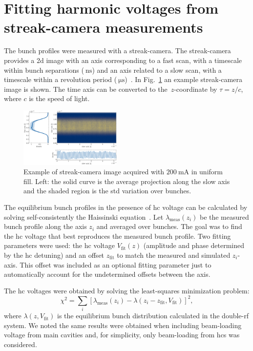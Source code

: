 \documentclass[a4paper,
               ]{jacow}
\begin{document}
\section{Fitting harmonic voltages from streak-camera measurements}
The bunch profiles were measured with a streak-camera. The streak-camera provides a 2d image with an axis corresponding to a fast scan, with a timescale within bunch separations ($\SI{}{\nano\second}$) and an axis related to a slow scan, with a timescale within a revolution period ($\SI{}{\micro\second}$)~\cite{Brosi:IFAST22}. In Fig.~\ref{fig:streak_camera_image} an example streak-camera image is shown. The time axis can be converted to the~$z$-coordinate by $\tau = z/c$, where $c$ is the speed of light.
\begin{figure}
    \centering
    \includegraphics[width=0.45\textwidth]{WEPR42_f1.pdf}
    \caption{Example of streak-camera image acquired with $\SI{200}{\milli\ampere}$ in uniform fill. Left: the solid curve is the average projection along the slow axis and the shaded region is the std variation over bunches.}
    \label{fig:streak_camera_image}
\end{figure}

The equilibrium bunch profiles in the presence of \gls{hc} voltage can be calculated by solving self-consistently the Haissinski equation~\cite{AlvesSa2023}. Let $\lambda_{\text{meas}}(z_i)$ be the measured bunch profile along the axis $z_i$ and averaged over bunches. The goal was to find the \gls{hc} voltage that best reproduces the measured bunch profile. Two fitting parameters were used: the \gls{hc} voltage $V_{\mathrm{fit}}(z)$ (amplitude and phase determined by the \gls{hc} detuning) and an offset $z_{\mathrm{fit}}$ to match the measured and simulated $z_i$-axis. This offset was included as an optional fitting parameter just to automatically account for the undetermined offsets between the axis.

The \gls{hc} voltages were obtained by solving the least-squares minimization problem:
\begin{equation}
\chi^2 = \sum_i \left[\lambda_{\text{meas}}(z_i) - \lambda(z_i - z_{\mathrm{fit}}, V_\mathrm{fit})\right]^2,
\end{equation}
where $\lambda(z, V_\mathrm{fit})$ is the equilibrium bunch distribution calculated in the double-rf system. We noted the same results were obtained when including beam-loading voltage from main cavities and, for simplicity, only beam-loading from \glspl{hc} was considered.
\end{document}
